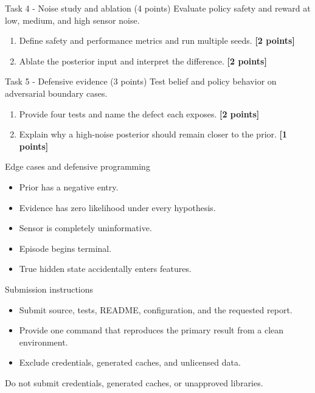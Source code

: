 \documentclass[aspectratio=169,11pt]{beamer}
\begin{document}
\begin{frame}{Task 4 - Noise study and ablation (4 points)}
\small
Evaluate policy safety and reward at low, medium, and high sensor noise.

\vspace{0.2cm}
\begin{enumerate}
\item[\textbf{a.}] Define safety and performance metrics and run multiple seeds. \hfill{\color{courseblue}\textbf{[2 points]}}
\item[\textbf{b.}] Ablate the posterior input and interpret the difference. \hfill{\color{courseblue}\textbf{[2 points]}}
\end{enumerate}
\end{frame}

\begin{frame}{Task 5 - Defensive evidence (3 points)}
\small
Test belief and policy behavior on adversarial boundary cases.

\vspace{0.2cm}
\begin{enumerate}
\item[\textbf{a.}] Provide four tests and name the defect each exposes. \hfill{\color{courseblue}\textbf{[2 points]}}
\item[\textbf{b.}] Explain why a high-noise posterior should remain closer to the prior. \hfill{\color{courseblue}\textbf{[1 points]}}
\end{enumerate}
\end{frame}

\begin{frame}{Edge cases and defensive programming}
\small
\begin{itemize}
  \item Prior has a negative entry.
  \item Evidence has zero likelihood under every hypothesis.
  \item Sensor is completely uninformative.
  \item Episode begins terminal.
  \item True hidden state accidentally enters features.
\end{itemize}
\end{frame}

\begin{frame}{Submission instructions}
\small
\begin{itemize}
  \item Submit source, tests, README, configuration, and the requested report.
  \item Provide one command that reproduces the primary result from a clean environment.
  \item Exclude credentials, generated caches, and unlicensed data.
\end{itemize}
\vspace{0.2cm}
\alert{Do not submit credentials, generated caches, or unapproved libraries.}
\end{frame}
\end{document}
